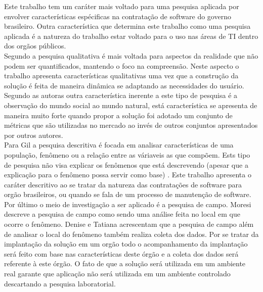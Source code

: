 Este trabalho tem um caráter mais voltado para uma pesquisa aplicada por envolver características espécificas na contratação de software do governo brasileiro. Outra característica que determina este trabalho como uma pesquisa aplicada é a natureza do trabalho estar voltado para o uso nas áreas de TI dentro dos orgãos públicos.
\\Segundo \cite{tatiana_denise} a pesquisa qualitativa é mais voltada para aspectos da realidade que não podem ser quantificados, mantendo o foco na compreensão. Neste aspecto o trabalho apresenta características qualitativas uma vez que a construção da solução é feita de maneira dinâmica se adaptando as necessidades do usuário. Segundo as autoras outra característica inerente a este tipo de pesquisa é a observação do mundo social ao mundo natural, está característica se apresenta de maneira muito forte quando propor a solução foi adotado um conjunto de métricas que são utilizadas no mercado ao invés de outros conjuntos apresentados por outros autores. 
\\Para Gil \cite{gil_como_2002} a pesquisa descritiva é focada em analisar características de uma população, fenômeno ou a relação entre as váriaveis as que compõem. Ests tipo de pesquisa não visa explicar os fenômenos que está descrevendo (apesar que a explicação para o fenômeno possa servir como base) \cite{moresi_metodologia_2003}. Este trabalho apresenta o caráter descritivo ao se tratar da natureza das contratações de software para orgão brasileiros, ou quando se fala de um processo de manutenção de software.
\\Por último o meio de investigação a ser aplicado é a pesquisa de campo. Moresi \cite{moresi_metodologia_2003} descreve a pesquisa de campo como sendo uma análise feita no local em que ocorre o fenômeno. Denise e Tatiana \cite{tatiana_denise} acrescentam que a pesquisa de campo além de analisar o local do fenômeno também realiza coleta dos dados. Por se tratar da implantação da solução em um orgão todo o acompanhamento da implantação será feito com base nas características deste órgão e a coleta dos dados será referente à este órgão. O fato de que a solução será utilizada em um ambiente real garante que aplicação não será utilizada em um ambiente controlado descartando a pesquisa laboratorial.

